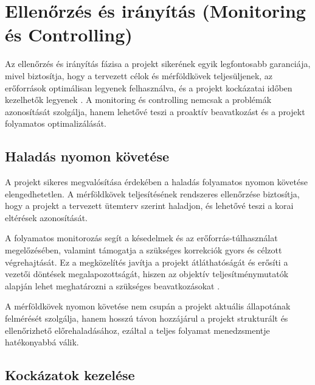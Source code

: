 \section{Ellenőrzés és irányítás (Monitoring és Controlling)}

Az ellenőrzés és irányítás fázisa a projekt sikerének egyik legfontosabb garanciája, mivel biztosítja, 
hogy a tervezett célok és mérföldkövek teljesüljenek, az erőforrások optimálisan legyenek felhasználva, 
és a projekt kockázatai időben kezelhetők legyenek \cite{Hajdu2014,Szalay2018,Kovacs2016,Kaposi2019}. 
A monitoring és controlling nemcsak a problémák azonosítását 
szolgálja, hanem lehetővé teszi a proaktív beavatkozást és a projekt folyamatos optimalizálását.

\subsection{Haladás nyomon követése}

A projekt sikeres megvalósítása érdekében a haladás folyamatos nyomon követése elengedhetetlen.  
A mérföldkövek teljesítésének rendszeres ellenőrzése biztosítja, hogy a projekt a tervezett ütemterv szerint haladjon,  
és lehetővé teszi a korai eltérések azonosítását.  

A folyamatos monitorozás segít a késedelmek és az erőforrás-túlhasználat megelőzésében,  
valamint támogatja a szükséges korrekciók gyors és célzott végrehajtását.  
Ez a megközelítés javítja a projekt átláthatóságát és erősíti a vezetői döntések megalapozottságát,  
hiszen az objektív teljesítménymutatók alapján lehet meghatározni a szükséges beavatkozásokat \cite{Kovacs2016,Kaposi2019}.  

A mérföldkövek nyomon követése nem csupán a projekt aktuális állapotának felmérését szolgálja,  
hanem hosszú távon hozzájárul a projekt strukturált és ellenőrizhető előrehaladásához,  
ezáltal a teljes folyamat menedzsmentje hatékonyabbá válik.

\subsection{Kockázatok kezelése}


